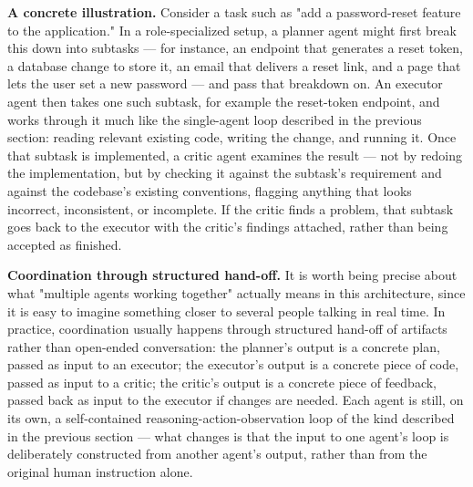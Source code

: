 \textbf{A concrete illustration.} Consider a task such as "add a password-reset feature to the application." In a role-specialized setup, a planner agent might first break this down into subtasks --- for instance, an endpoint that generates a reset token, a database change to store it, an email that delivers a reset link, and a page that lets the user set a new password --- and pass that breakdown on. An executor agent then takes one such subtask, for example the reset-token endpoint, and works through it much like the single-agent loop described in the previous section: reading relevant existing code, writing the change, and running it. Once that subtask is implemented, a critic agent examines the result --- not by redoing the implementation, but by checking it against the subtask's requirement and against the codebase's existing conventions, flagging anything that looks incorrect, inconsistent, or incomplete. If the critic finds a problem, that subtask goes back to the executor with the critic's findings attached, rather than being accepted as finished.

\textbf{Coordination through structured hand-off.} It is worth being precise about what "multiple agents working together" actually means in this architecture, since it is easy to imagine something closer to several people talking in real time. In practice, coordination usually happens through structured hand-off of artifacts rather than open-ended conversation: the planner's output is a concrete plan, passed as input to an executor; the executor's output is a concrete piece of code, passed as input to a critic; the critic's output is a concrete piece of feedback, passed back as input to the executor if changes are needed. Each agent is still, on its own, a self-contained reasoning-action-observation loop of the kind described in the previous section --- what changes is that the input to one agent's loop is deliberately constructed from another agent's output, rather than from the original human instruction alone.

